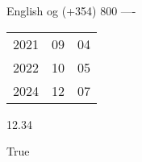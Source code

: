 \documentclass[10pt,a4paper]{article}
\begin{document}
	English og (+354) 800 ----

	\begin{tabular}{lll}
		2021 & 09 & 04\\
		2022 & 10 & 05\\
		2024 & 12 & 07
	\end{tabular}


	12.34
	
	
	True
\end{document}
